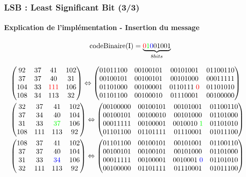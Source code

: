 \documentclass{beamer}
\begin{document}
\begin{frame}
\frametitle{LSB : Least Significant Bit (3/3)}
\framesubtitle{Explication de l'implémentation \-- \textbf{Insertion du message}}

\[ \text{codeBinaire(I)} = \underbrace{\textcolor{red}{0} \textcolor{green}{1} \textcolor{blue}{0} 01001}_{8 bits} \]
\begin{addmargin}[-2.5em]{-4em}
\begin{align*}
& \begin{pmatrix}
92 & 37 & 41 & 102 \\
37 & 37 & 40 & 31 \\
104 & 33 & \textcolor{red}{111} & 106 \\
108 & 34 & 113 & 32 \\
\end{pmatrix}
\Leftrightarrow
\begin{pmatrix}
01011100 & 00100101 & 00101001 & 01100110 \\
00100101 & 00100101 & 00101000 & 00011111 \\
01101000 & 00100001 & 0110111 \; \textcolor{red}{0} & 01101010 \\
01101100 & 00100010 & 01110001 & 00100000 \\
\end{pmatrix} 
& \\
& \begin{pmatrix}
32 & 37 & 41 & 102 \\
37 & 34 & 40 & 104 \\
31 & 33 & \textcolor{green}{37} & 106 \\
108 & 111 & 113 & 92 \\
\end{pmatrix}
\Leftrightarrow
\begin{pmatrix}
00100000 & 00100101 & 00101001 & 01100110 \\
00100101 & 00100010 & 00101000 & 01101000 \\
00011111 & 00100001 & 0010010 \; \textcolor{green}{1} & 01101010 \\
01101100 & 01101111 & 01110001 & 01011100 \\
\end{pmatrix}
& \\
& \begin{pmatrix}
108 & 37 & 41 & 102 \\
37 & 37 & 40 & 104 \\
31 & 33 & \textcolor{blue}{34} & 106 \\
32 & 111 & 113 & 92 \\
\end{pmatrix}
\Leftrightarrow
\begin{pmatrix}
01101100 & 00100101 & 00101001 & 01100110 \\
00100101 & 00100101 & 00101000 & 01101000 \\
00011111 & 00100001 & 0010001  \; \textcolor{blue}{0} & 01101010 \\
00100000 & 01101111 & 01110001 & 01011100 \\
\end{pmatrix}
\end{align*}
\end{addmargin}
\end{frame}
\end{document}
